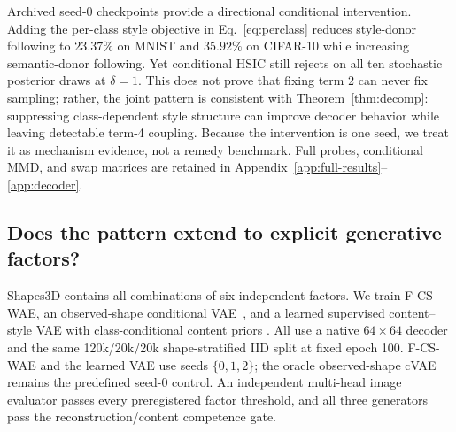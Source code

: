 \documentclass{article}
\begin{document}
Archived seed-0 checkpoints provide a directional conditional intervention.
Adding the per-class style objective in Eq.~\ref{eq:perclass} reduces
style-donor following to $23.37\%$ on MNIST and $35.92\%$ on CIFAR-10 while
increasing semantic-donor following.  Yet conditional HSIC still rejects on
all ten stochastic posterior draws at $\delta=1$.  This does not prove that
fixing term 2 can never fix sampling; rather, the joint pattern is consistent
with Theorem~\ref{thm:decomp}: suppressing class-dependent style structure can
improve decoder behavior while leaving detectable term-4 coupling.  Because
the intervention is one seed, we treat it as mechanism evidence, not a remedy
benchmark.  Full probes, conditional MMD, and swap matrices are retained in
Appendix~\ref{app:full-results}--\ref{app:decoder}.

\FloatBarrier

\subsection{Does the pattern extend to explicit generative factors?}
\label{sec:shapes3d}

Shapes3D contains all combinations of six independent factors.  We train
F-CS-WAE, an observed-shape conditional VAE~\citep{sohn2015learning}, and a
learned supervised content--style VAE with class-conditional content priors
\citep{ilse2020diva}.  All use a native $64\times64$ decoder and the same
120k/20k/20k shape-stratified IID split at fixed epoch 100.  F-CS-WAE and the
learned VAE use seeds $\{0,1,2\}$; the oracle observed-shape cVAE remains the
predefined seed-0 control.  An
independent multi-head image evaluator passes every preregistered factor
threshold, and all three generators pass the reconstruction/content
competence gate.

\begin{table}[ht]
\caption{Shapes3D audit.  Except for seed-0 global MMD, F-CS-WAE/learned-VAE
entries are rounded three-seed means; the observed-shape cVAE is seed 0.
$z_c\!\to$style averages five nuisance-factor probes.}
\label{tab:shapes3d}
\centering
\scriptsize
\setlength{\tabcolsep}{3.2pt}
\end{table}
\end{document}
